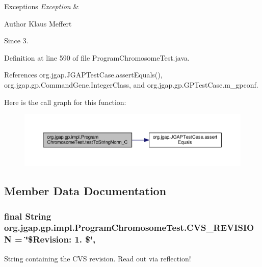 \begin{DoxyExceptions}{Exceptions}
{\em Exception} & \\
\hline
\end{DoxyExceptions}
\begin{DoxyAuthor}{Author}
Klaus Meffert 
\end{DoxyAuthor}
\begin{DoxySince}{Since}
3. 
\end{DoxySince}


Definition at line 590 of file Program\-Chromosome\-Test.\-java.



References org.\-jgap.\-J\-G\-A\-P\-Test\-Case.\-assert\-Equals(), org.\-jgap.\-gp.\-Command\-Gene.\-Integer\-Class, and org.\-jgap.\-gp.\-G\-P\-Test\-Case.\-m\-\_\-gpconf.



Here is the call graph for this function\-:
\nopagebreak
\begin{figure}[H]
\begin{center}
\leavevmode
\includegraphics[width=350pt]{classorg_1_1jgap_1_1gp_1_1impl_1_1_program_chromosome_test_a70e74cbd2b1dad2434e43512cba5ab6e_cgraph}
\end{center}
\end{figure}




\subsection{Member Data Documentation}
\hypertarget{classorg_1_1jgap_1_1gp_1_1impl_1_1_program_chromosome_test_a4c081eb4f908153b972f1bb6ec31327b}{
\subsubsection[{C\-V\-S\-\_\-\-R\-E\-V\-I\-S\-I\-O\-N}]{\setlength{\rightskip}{0pt plus 5cm}final String org.\-jgap.\-gp.\-impl.\-Program\-Chromosome\-Test.\-C\-V\-S\-\_\-\-R\-E\-V\-I\-S\-I\-O\-N = \char`\"{}\$Revision\-: 1. \$\char`\"{}\hspace{0.3cm}{\ttfamily [static]}, {\ttfamily [private]}}}\label{classorg_1_1jgap_1_1gp_1_1impl_1_1_program_chromosome_test_a4c081eb4f908153b972f1bb6ec31327b}
String containing the C\-V\-S revision. Read out via reflection! 

